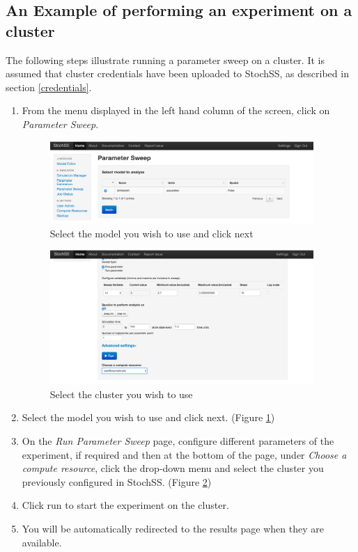 \subsection{An Example of performing an experiment on a cluster}
The following steps illustrate running a parameter sweep on a cluster. It is assumed that cluster credentials have been uploaded to StochSS, as described in section \ref{credentials}.
\begin{enumerate}
\item From the menu displayed in the left hand column of the screen, click on \textit {Parameter Sweep}.

\begin{figure}[!ht]
\centering
\includegraphics[width=100mm,scale=0.5]{cluster/figure3.png}
\caption{Select the model you wish to use and click next}
\label{fig:3}
\end{figure}

\begin{figure}[!ht]
\centering
\includegraphics[width=100mm,scale=0.5]{cluster/figure4.png}
\caption{Select the cluster you wish to use}
\label{fig:4}
\end{figure}

\item Select the model you wish to use and click next. (Figure \ref{fig:3})
\item On the \textit{Run Parameter Sweep} page, configure different parameters of the experiment, if required and then at the bottom of the page, under \textit {Choose a compute resource}, click the drop-down menu and select the cluster you previously configured in StochSS. (Figure \ref{fig:4})
\item Click run to start the experiment on the cluster.
\item You will be automatically redirected to the results page when they are available.
\end{enumerate}

